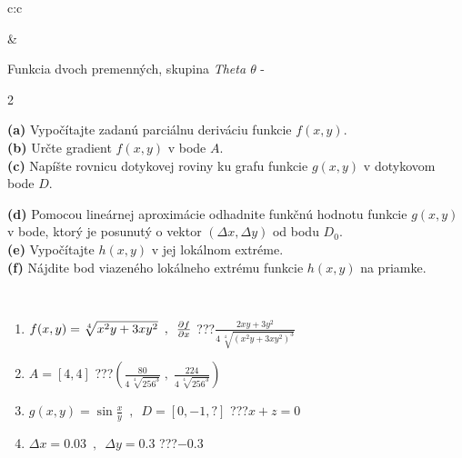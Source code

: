 \documentclass[10pt]{report}
\begin{document}
\begin{tabular}{c:c}
\begin{minipage}[c][104.5mm][t]{0.5\linewidth}
\begin{center}
\end{center}
\end{minipage}
&
\begin{minipage}[c][104.5mm][t]{0.5\linewidth}
\begin{center}
\vspace{7mm}
{\huge \LARGE Funkcia dvoch premenných, skupina \textit{Theta $\theta$} -}\\[5mm]
\begin{minipage}{0.95\linewidth}
\begin{center}
{\small \begin{multicols}{2} \raggedright
\textbf{(a)} Vypočítajte zadanú parciálnu deriváciu funkcie \(f(x,y)\). \\[1mm]
\textbf{(b)} Určte gradient \(f(x,y)\) v bode \(A\). \\[1mm]
\textbf{(c)} Napíšte rovnicu dotykovej roviny ku grafu funkcie \(g(x,y)\) v dotykovom bode \(D\). \par \columnbreak
\textbf{(d)} Pomocou lineárnej aproximácie odhadnite funkčnú hodnotu funkcie \(g(x,y)\) v bode, ktorý je posunutý o vektor \((\Delta x, \Delta y)\) od bodu \(D_0\). \\[1mm]
\textbf{(e)} Vypočítajte \(h(x,y)\) v jej lokálnom extréme. \\[1mm]
\textbf{(f)} Nájdite bod viazeného lokálneho extrému funkcie \(h(x,y)\) na priamke. \\[1mm]
\end{multicols}
}
\end{center}
\end{minipage}
\\[4mm]
\begin{minipage}{0.79\linewidth}
\begin{center}
\begin{varwidth}{\linewidth}
\begin{enumerate}
\normalsizerr
\item $f(x,y) = \sqrt[4]{x^2y + 3xy^2}\enspace , \enspace \pdv{f}{x}$\quad \dotfill\; ???\;\dotfill \quad $\frac{2xy+3y^2}{4\,\sqrt[4]{(x^2y+3xy^2)^{3}}}$
\item $A = [4, 4]$\quad \dotfill\; ???\;\dotfill \quad $\left( \frac{80}{4\,\sqrt[4]{256^3}} \;,\; \frac{224}{4\,\sqrt[4]{256^3}} \right)$
\item $g(x,y) = \sin\frac{x}{y} \enspace , \enspace D = [0, -1, ?]$\quad \dotfill\; ???\;\dotfill \quad $x+z=0$
\item $\Delta x = {0.03} \enspace,\enspace \Delta y = {0.3}$\quad \dotfill\; ???\;\dotfill \quad $-0.3$

\end{enumerate}
\end{varwidth}
\end{center}
\end{minipage}
\end{center}
\end{minipage}
\end{tabular}
\end{document}
